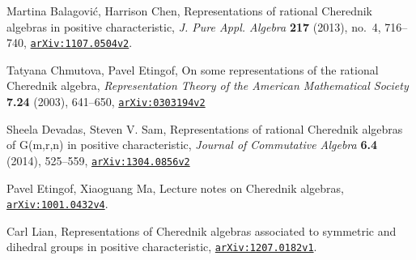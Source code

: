 \documentclass{article}
\numberwithin{equation}{section}
\newcommand{\arxiv}[1]{\href{http://arxiv.org/abs/#1}{{\tt arXiv:#1}}}
\begin{document}
\begin{thebibliography}{2}

\setlength{\itemsep}{-1mm}
\small

 Martina Balagovi\'c, Harrison Chen, Representations of rational Cherednik algebras in positive characteristic, {\it J. Pure Appl. Algebra} {\bf 217} (2013), no.~4, 716--740, \arxiv{1107.0504v2}.

 Tatyana Chmutova, Pavel Etingof, On some representations of the rational Cherednik algebra, {\it Representation Theory of the American Mathematical Society} {\bf 7.24} (2003), 641--650, \arxiv{0303194v2}

 Sheela Devadas, Steven V. Sam, Representations of rational Cherednik algebras of G(m,r,n) in positive characteristic, {\it Journal of Commutative Algebra} {\bf 6.4} (2014), 525--559, \arxiv{1304.0856v2}

 Pavel Etingof, Xiaoguang Ma, Lecture notes on Cherednik algebras, \arxiv{1001.0432v4}.

 Carl Lian, Representations of Cherednik algebras associated to symmetric and dihedral groups in positive characteristic, \arxiv{1207.0182v1}.

\end{thebibliography}
\end{document}
